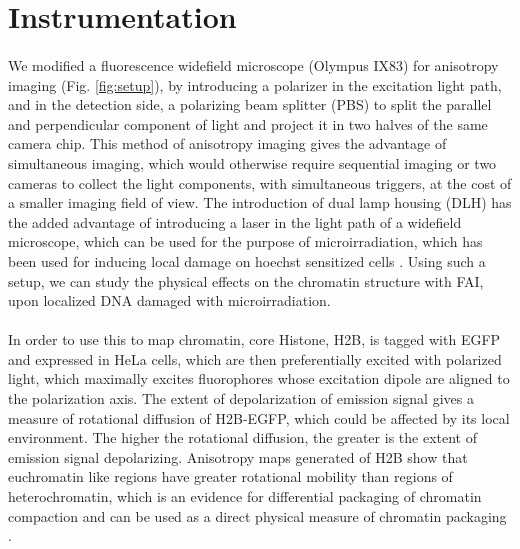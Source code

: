 \section{Instrumentation}
\paragraph*{} We modified a fluorescence widefield microscope (Olympus IX83) for anisotropy imaging (Fig. \ref{fig:setup}), by introducing a polarizer in the excitation light path, and in the detection side, a polarizing beam splitter (PBS) to split the parallel and perpendicular component of light and project it in two halves of the same camera chip. This method of anisotropy imaging gives the advantage of simultaneous imaging, which would otherwise require sequential imaging or two cameras to collect the light components, with simultaneous triggers, at the cost of a smaller imaging field of view. The introduction of dual lamp housing (DLH) has the added advantage of introducing a laser in the light path of a widefield microscope, which can be used for the purpose of microirradiation, which has been used for inducing local damage on hoechst sensitized cells \cite{BURGESS20141703}. Using such a setup, we can study the physical effects on the chromatin structure with FAI, upon localized DNA damaged with microirradiation.


\paragraph*{} In order to use this to map chromatin, core Histone, H2B, is tagged with EGFP and expressed in HeLa cells, which are then preferentially excited with polarized light, which maximally excites fluorophores whose excitation dipole are aligned to the polarization axis. The extent of depolarization of emission signal gives a measure of rotational diffusion of H2B-EGFP, which could be affected by its local environment. The higher the rotational diffusion, the greater is the extent of emission signal depolarizing. Anisotropy maps generated of H2B show that euchromatin like regions have greater rotational mobility than regions of heterochromatin, which is an evidence for differential packaging of chromatin compaction and can be used as a direct physical measure of chromatin packaging \cite{bhattacharya2009spatio}.

